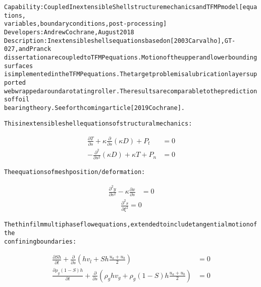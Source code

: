 \documentclass{article}
\begin{document}
\begin{alltt}
Capability: Coupled Inextensible Shell structure mechanics and TFMP model [equations, 
variables, boundary conditions, post-processing]
Developers: Andrew Cochrane, August 2018
Description: Inextensible shells equations based on [2003 Carvalho], GT-027, and Pranck
dissertation are coupled to TFMP equations. Motion of the upper and lower bounding surfaces
is implemented in the TFMP equations. The target problem is a lubrication layer supported 
web wrapped around a rotating roller. The results are comparable to the predictions of foil
bearing theory. See forthcoming article [2019 Cochrane].
\end{alltt}
\begin{alltt}
This inextensible shell equations of structural mechanics:
\end{alltt}
\begin{align*}
\frac{\partial T}{\partial s} + \kappa \frac{\partial }{ \partial s }( \kappa D ) + P_t &= 0 \\
- \frac{\partial^2}{\partial s^2}(\kappa D) + \kappa T + P_n &= 0
\end{align*}
\begin{alltt}
The equations of mesh position/deformation:
\end{alltt}
\begin{align*}
\frac{\partial^2 y}{\partial s ^2} - \kappa \frac{\partial x}{\partial s} &= 0
\end{align*}
\begin{align*}
  \frac{\partial^2 s}{\partial \xi^2} = 0
\end{align*}
\begin{alltt}
The thin film multiphase flow equations, extended to include tangential motion of the 
confining boundaries:
\end{alltt}
\begin{align*}
  \frac{\partial Sh}{\partial t} + \frac{\partial}{\partial s} \left(h v_l + Sh\frac{u_a + u_b}{2}\right) &= 0 \\
  \frac{\partial \rho_g(1-S)h}{\partial t} + \frac{\partial}{\partial s} \left(\rho_g h v_g + \rho_g (1-S)h\frac{u_a + u_b}{2}\right)  &= 0
\end{align*}
\end{document}
